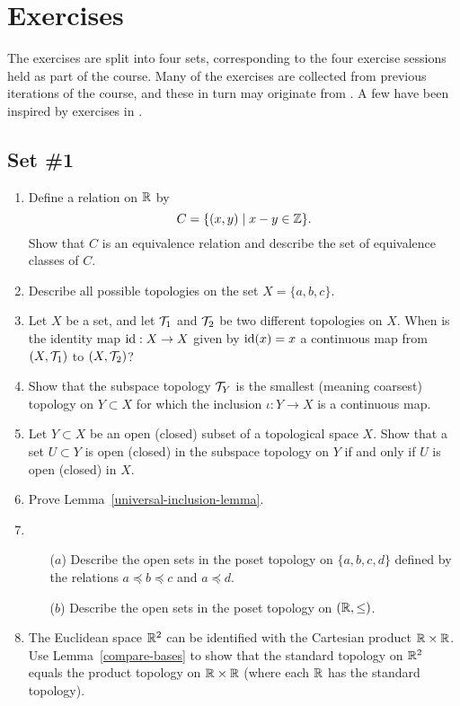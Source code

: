 \section{Exercises}
The exercises are split into four sets, corresponding to the four exercise sessions held as part of the course. Many of the exercises are collected from previous iterations of the course, and these in turn may originate from \cite{Mun}. A few have been inspired by exercises in \cite{DM}.

\subsection{Set \#1}
\begin{enumerate}[label=1.\arabic*]
  \item Define a relation on $\mathbb{R}$ by
    \[
      C=\{(x,y) \mid x - y \in \mathbb{Z} \}.
    \]
    Show that $C$ is an equivalence relation and describe the set of equivalence classes of $C$.
  \item Describe all possible topologies on the set $X = \{a,b,c\}$.
  \item Let $X$ be a set, and let $\mathcal{T}_1$ and $\mathcal{T}_2$ be two different topologies on $X$. When is the identity map $\mathrm{id} : X \to X$ given by $\mathrm{id}(x) = x$ a continuous map from $(X,\mathcal{T}_1)$ to $(X,\mathcal{T}_2)$?
  \item
		Show that the subspace topology $\mathcal{T}_Y$ is the smallest (meaning coarsest) topology on $Y\subset X$ for which the inclusion $\iota:Y \rightarrow X$ is a continuous map.
	
	\item \label{opens-in-opens} Let $Y\subset X$ be an open (closed) subset of a topological space $X$. Show that a set $U \subset Y$ is open (closed) in the subspace topology on $Y$ if and only if $U$ is open (closed) in $X$.
	
	\item \label{universal-inclusion} Prove Lemma~\ref{universal-inclusion-lemma}.
	
  \item \begin{itemize}
		\item[($a$)] Describe the open sets in the poset topology on $\{a,b,c,d\}$ defined by the relations $a\preceq b\preceq c$ and $a\preceq d$.
		\item[($b$)] Describe the open sets in the poset topology on $(\mathbb{R},\leq)$.
	\end{itemize}
	
  \item The Euclidean space $\mathbb{R}^2$ can be identified with the Cartesian product $\mathbb{R} \times \mathbb{R}$. Use Lemma~\ref{compare-bases} to show that the standard topology on $\mathbb{R}^2$ equals the product topology on $\mathbb{R} \times \mathbb{R}$ (where each $\mathbb{R}$ has the standard topology).
  


\end{enumerate}
